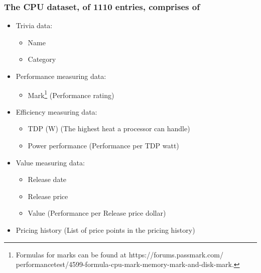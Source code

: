 \documentclass[conference]{IEEEtran}
\begin{document}
\subsubsection{The CPU dataset, of 1110 entries, comprises of}
\begin{itemize}
	\item Trivia data:
	      \begin{itemize}
		      \item Name
		      \item Category
	      \end{itemize}
	\item Performance measuring data:
	      \begin{itemize}
		      \item Mark\footnote{Formulas for marks can be found at https://forums.passmark.com/\\performancetest/4599-formula-cpu-mark-memory-mark-and-disk-mark.}
		            (Performance rating)
	      \end{itemize}
	\item Efficiency measuring data:
	      \begin{itemize}
		      \item TDP (W) (The highest heat a processor can handle)
		      \item Power performance (Performance per TDP watt)
	      \end{itemize}
	\item Value measuring data:
	      \begin{itemize}
		      \item Release date
		      \item Release price
		      \item Value (Performance per Release price dollar)
	      \end{itemize}
	\item Pricing history (List of price points in the pricing history)
\end{itemize}
\end{document}
